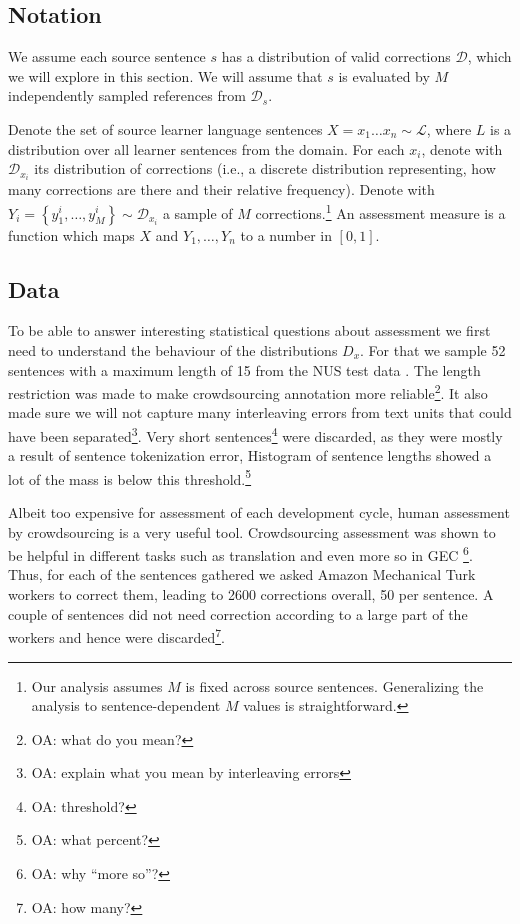 \documentclass[english]{article}
\newcommand{\oa}[1]{\footnote{\color{red}OA: #1}}
\begin{document}
\subsection{Notation}

We assume each source sentence $s$ has a distribution of valid corrections $\mathcal{D}$,
which we will explore in this section. We will assume that $s$ is evaluated by
$M$ independently sampled references from $\mathcal{D}_s$.

Denote the set of source learner language sentences $X=x_{1}\ldots x_n\sim \mathcal{L}$, where
$L$ is a distribution over all learner sentences from the domain. For each $x_i$, denote
with $\mathcal{D}_{x_i}$ its distribution of corrections (i.e., a discrete
distribution representing, how many corrections are there and their relative frequency).
Denote with $Y_i = \left\{y_{1}^{i},\ldots, y_{M}^{i}\right\} \sim \mathcal{D}_{x_i}$
a sample of $M$ corrections.\footnote{Our analysis assumes $M$ is fixed across source sentences.
  Generalizing the analysis to sentence-dependent $M$ values is straightforward.}
An assessment measure is a function which maps $X$ and $Y_1,\ldots,Y_n$ to
a number in $[0,1]$.

\subsection{Data}

To be able to answer interesting statistical questions about assessment we first
need to understand the behaviour of the distributions $D_x$. For that we sample
52 sentences with a maximum length of 15 from the NUS test data
\cite{dahlmeier2013building}. The length restriction was made to make crowdsourcing
annotation more reliable\oa{what do you mean?}.
It also made sure we will not capture many interleaving
errors from text units that could have been separated\oa{explain what you mean by
  interleaving errors}.
Very short sentences\oa{threshold?} were discarded, as they were
mostly a result of sentence tokenization error,
Histogram of sentence lengths showed a lot of the mass is below this threshold.\oa{what percent?}

Albeit too expensive for assessment of each development cycle, human assessment
by crowdsourcing is a very useful tool. Crowdsourcing assessment was shown to
be helpful in different tasks such as translation
\cite{zaidan2011crowdsourcing,post2012constructing,graham2015improved}
and even more so in GEC \cite{madnani2011they}\oa{why ``more so''?}.
Thus, for each of the sentences gathered we asked Amazon Mechanical Turk workers to correct them, leading to 2600 corrections overall,
50 per sentence. A couple of sentences did not need correction according to a large part of the workers and hence were discarded\oa{how many?}.
\end{document}
